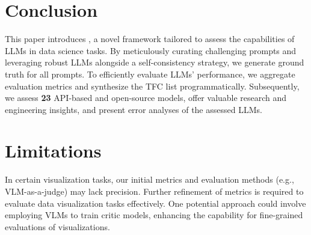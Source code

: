 \section{Conclusion}
\vspace{-0.2cm}
\label{sec: discussion}
This paper introduces \benchmark, a novel framework tailored to assess the capabilities of LLMs in data science tasks. By meticulously curating challenging prompts and leveraging robust LLMs alongside a self-consistency strategy, we generate ground truth for all prompts. To efficiently evaluate LLMs' performance, we aggregate evaluation metrics and synthesize the TFC list programmatically. Subsequently, we assess \textbf{23} API-based and open-source models, offer valuable research and engineering insights, and present error analyses of the assessed LLMs.

\section{Limitations}
In certain visualization tasks, our initial metrics and evaluation methods (e.g., VLM-as-a-judge) may lack precision. Further refinement of metrics is required to evaluate data visualization tasks effectively. One potential approach could involve employing VLMs to train critic models, enhancing the capability for fine-grained evaluations of visualizations.
